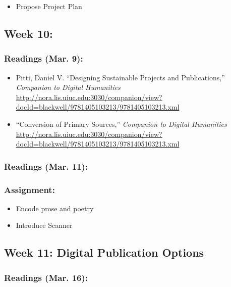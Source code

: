 \documentclass[]{article}
\begin{document}
\begin{itemize}
\itemsep1pt\parskip0pt
\item
  Propose Project Plan
\end{itemize}

\subsection{Week 10:}\label{week-10}

\subsubsection{Readings (Mar. 9):}\label{readings-mar.-9}

\begin{itemize}
\itemsep1pt\parskip0pt
\item
  Pitti, Daniel V. ``Designing Sustainable Projects and Publications,''
  \emph{Companion to Digital Humanities}
  \url{http://nora.lis.uiuc.edu:3030/companion/view?docId=blackwell/9781405103213/9781405103213.xml}
\item
  ``Conversion of Primary Sources,'' \emph{Companion to Digital
  Humanities}
  \url{http://nora.lis.uiuc.edu:3030/companion/view?docId=blackwell/9781405103213/9781405103213.xml}
\end{itemize}

\subsubsection{Readings (Mar. 11):}\label{readings-mar.-11}

\subsubsection{Assignment:}\label{assignment-8}

\begin{itemize}
\itemsep1pt\parskip0pt
\item
  Encode prose and poetry
\item
  Introduce Scanner
\end{itemize}

\subsection{Week 11: Digital Publication
Options}\label{week-11-digital-publication-options}

\subsubsection{Readings (Mar. 16):}\label{readings-mar.-16}
\end{document}
